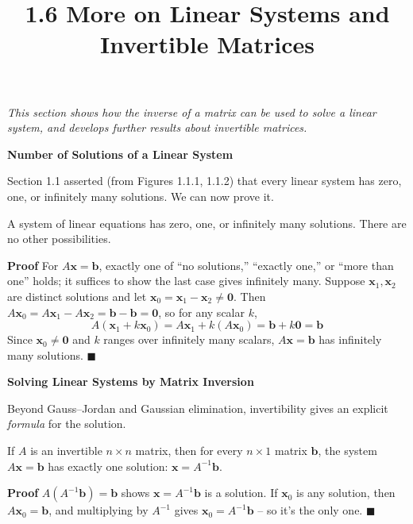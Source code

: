 \documentclass{article}
\title{1.6 More on Linear Systems and Invertible Matrices}
\date{}
\author{}
\newcommand{\redheading}[1]{{\vspace{2mm}\noindent\Large\bfseries\color{red!55!black} #1\par}\vspace{2mm}}
\theoremstyle{mystyle}
\begin{document}
\maketitle

{\itshape\color{blue!45!black}
This section shows how the inverse of a matrix can be used to solve a linear system, and develops further results about invertible matrices.\par}

\redheading{Number of Solutions of a Linear System}

Section 1.1 asserted (from Figures 1.1.1, 1.1.2) that every linear system has zero, one, or infinitely many solutions. We can now prove it.

\begin{tcolorbox}[colback=red!4, colframe=red!60!black, title=Theorem 1.6.1, boxrule=0.5mm, arc=3mm]
A system of linear equations has zero, one, or infinitely many solutions. There are no other possibilities.
\end{tcolorbox}
\textbf{Proof} For $A\mathbf{x}=\mathbf{b}$, exactly one of ``no solutions,'' ``exactly one,'' or ``more than one'' holds; it suffices to show the last case gives infinitely many. Suppose $\mathbf{x}_1,\mathbf{x}_2$ are distinct solutions and let $\mathbf{x}_0=\mathbf{x}_1-\mathbf{x}_2\ne\mathbf{0}$. Then $A\mathbf{x}_0=A\mathbf{x}_1-A\mathbf{x}_2=\mathbf{b}-\mathbf{b}=\mathbf{0}$, so for any scalar $k$,
\[
A(\mathbf{x}_1+k\mathbf{x}_0)=A\mathbf{x}_1+k(A\mathbf{x}_0)=\mathbf{b}+k\mathbf{0}=\mathbf{b}
\]
Since $\mathbf{x}_0\ne\mathbf{0}$ and $k$ ranges over infinitely many scalars, $A\mathbf{x}=\mathbf{b}$ has infinitely many solutions. $\blacksquare$

\redheading{Solving Linear Systems by Matrix Inversion}

Beyond Gauss--Jordan and Gaussian elimination, invertibility gives an explicit \emph{formula} for the solution.

\begin{tcolorbox}[colback=red!4, colframe=red!60!black, title=Theorem 1.6.2, boxrule=0.5mm, arc=3mm]
If $A$ is an invertible $n\times n$ matrix, then for every $n\times1$ matrix $\mathbf{b}$, the system $A\mathbf{x}=\mathbf{b}$ has exactly one solution: $\mathbf{x}=A^{-1}\mathbf{b}$.
\end{tcolorbox}
\textbf{Proof} $A(A^{-1}\mathbf{b})=\mathbf{b}$ shows $\mathbf{x}=A^{-1}\mathbf{b}$ is a solution. If $\mathbf{x}_0$ is any solution, then $A\mathbf{x}_0=\mathbf{b}$, and multiplying by $A^{-1}$ gives $\mathbf{x}_0=A^{-1}\mathbf{b}$ -- so it's the only one. $\blacksquare$
\end{document}
